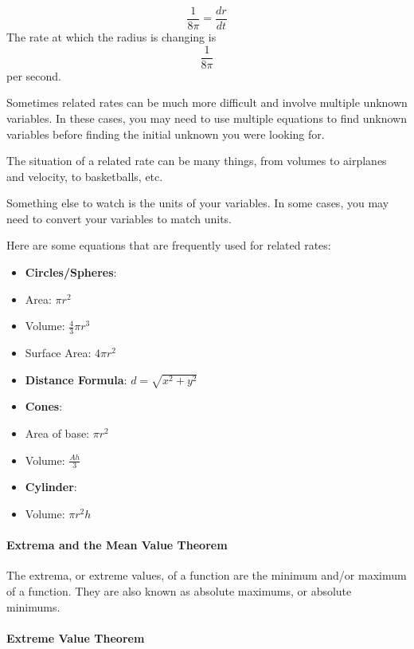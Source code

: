 $$
\frac{1}{8\pi} = \frac{dr}{dt}
$$
The rate at which the radius is changing is
$$
\frac{1}{8\pi}
$$
per second.



Sometimes related rates can be much more difficult and involve multiple unknown variables. In these cases, you may need to use multiple equations to find unknown variables before finding the initial unknown you were looking for.



The situation of a related rate can be many things, from volumes to airplanes and velocity, to basketballs, etc.



Something else to watch is the units of your variables. In some cases, you may need to convert your variables to match units.



Here are some equations that are frequently used for related rates:



\begin{itemize}
    \item \textbf{Circles/Spheres}:
    \item Area: $\pi r^2$
    \item Volume: $\frac{4}{3}\pi r^3$
    \item Surface Area: $4\pi r^2$
    \item \textbf{Distance Formula}: $d = \sqrt{x^2 + y^2}$
    \item \textbf{Cones}:
    \item Area of base: $\pi r^2$
    \item Volume: $\frac{Ah}{3}$
    \item \textbf{Cylinder}:
    \item Volume: $\pi r^2h$
\end{itemize}

\paragraph{Extrema and the Mean Value Theorem}



The extrema, or extreme values, of a function are the minimum and/or maximum of a function. They are also known as absolute maximums, or absolute minimums.



\paragraph{Extreme Value Theorem}



